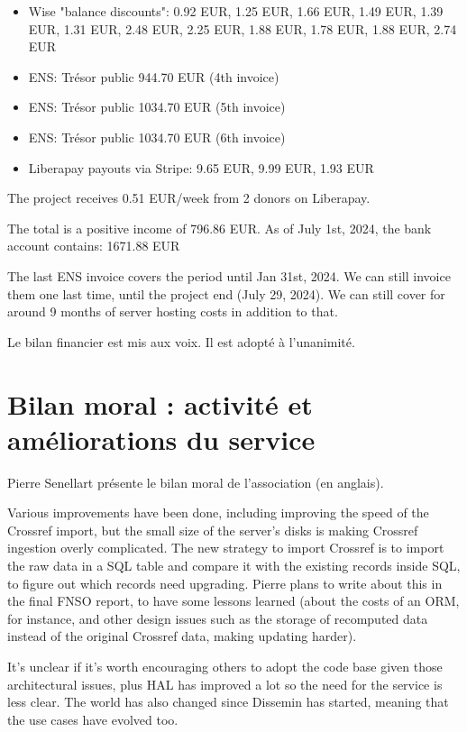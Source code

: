 \documentclass[a4paper]{article}
\begin{document}
\begin{itemize}
  \item Wise "balance discounts": 0.92 EUR, 1.25 EUR, 1.66 EUR, 1.49 EUR, 1.39 EUR, 1.31 EUR, 2.48 EUR, 2.25 EUR, 1.88 EUR, 1.78 EUR, 1.88 EUR, 2.74 EUR
  \item ENS: Trésor public 944.70 EUR (4th invoice)
  \item ENS: Trésor public 1034.70 EUR (5th invoice)
  \item ENS: Trésor public 1034.70 EUR (6th invoice)
  \item Liberapay payouts via Stripe: 9.65 EUR, 9.99 EUR, 1.93 EUR
\end{itemize}

The project receives 0.51 EUR/week from 2 donors on Liberapay.

The total is a positive income of 796.86 EUR. As of July 1st, 2024, the bank account contains: 1671.88 EUR

The last ENS invoice covers the period until Jan 31st, 2024. We can still
invoice them one last time, until the project end (July 29, 2024). We can still
cover for around 9 months of server hosting costs in addition to that.

Le bilan financier est mis aux voix. Il est adopté à l'unanimité.

\section{Bilan moral : activité et améliorations du service}

Pierre Senellart présente le bilan moral de l'association (en anglais).

Various improvements have been done, including improving the speed of the Crossref import, but the small size of the server's disks is making Crossref ingestion overly complicated. The new strategy to import Crossref is to import the raw data in a SQL table and compare it with the existing records inside SQL, to figure out which records need upgrading. Pierre plans to write about this in the final FNSO report, to have some lessons learned (about the costs of an ORM, for instance, and other design issues such as the storage of recomputed data instead of the original Crossref data, making updating harder).

It's unclear if it's worth encouraging others to adopt the code base given those architectural issues, plus HAL has improved a lot so the need for the service is less clear. The world has also changed since Dissemin has started, meaning that the use cases have evolved too.
\end{document}
